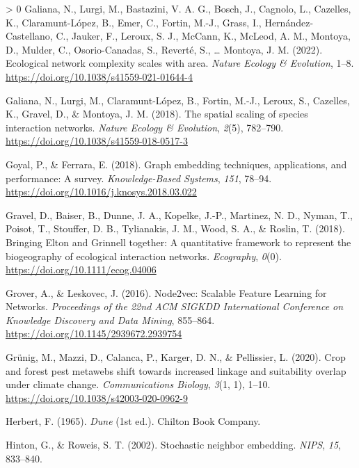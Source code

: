 \documentclass[11pt]{article}
\newlength{\cslhangindent}
\newenvironment{CSLReferences}[3] %
 {%
  \setlength{\parindent}{0pt}
  \ifodd #1 \everypar{\setlength{\hangindent}{\cslhangindent}}\ignorespaces\fi
  \ifnum #2 > 0
  \setlength{\parskip}{#2\baselineskip}
  \fi
 }%
 {}
\begin{document}
\begin{CSLReferences}{1}{0}
\leavevmode\hypertarget{ref-Galiana2022EcoNet}{}%
Galiana, N., Lurgi, M., Bastazini, V. A. G., Bosch, J., Cagnolo, L.,
Cazelles, K., Claramunt-López, B., Emer, C., Fortin, M.-J., Grass, I.,
Hernández-Castellano, C., Jauker, F., Leroux, S. J., McCann, K., McLeod,
A. M., Montoya, D., Mulder, C., Osorio-Canadas, S., Reverté, S.,
\ldots{} Montoya, J. M. (2022). Ecological network complexity scales
with area. \emph{Nature Ecology \& Evolution}, 1--8.
\url{https://doi.org/10.1038/s41559-021-01644-4}

\leavevmode\hypertarget{ref-Galiana2018SpaSca}{}%
Galiana, N., Lurgi, M., Claramunt-López, B., Fortin, M.-J., Leroux, S.,
Cazelles, K., Gravel, D., \& Montoya, J. M. (2018). The spatial scaling
of species interaction networks. \emph{Nature Ecology \& Evolution},
\emph{2}(5), 782--790. \url{https://doi.org/10.1038/s41559-018-0517-3}

\leavevmode\hypertarget{ref-Goyal2018GraEmb}{}%
Goyal, P., \& Ferrara, E. (2018). Graph embedding techniques,
applications, and performance: A survey. \emph{Knowledge-Based Systems},
\emph{151}, 78--94. \url{https://doi.org/10.1016/j.knosys.2018.03.022}

\leavevmode\hypertarget{ref-Gravel2018BriElt}{}%
Gravel, D., Baiser, B., Dunne, J. A., Kopelke, J.-P., Martinez, N. D.,
Nyman, T., Poisot, T., Stouffer, D. B., Tylianakis, J. M., Wood, S. A.,
\& Roslin, T. (2018). Bringing Elton and Grinnell together: A
quantitative framework to represent the biogeography of ecological
interaction networks. \emph{Ecography}, \emph{0}(0).
\url{https://doi.org/10.1111/ecog.04006}

\leavevmode\hypertarget{ref-Grover2016NodSca}{}%
Grover, A., \& Leskovec, J. (2016). Node2vec: Scalable Feature Learning
for Networks. \emph{Proceedings of the 22nd ACM SIGKDD International
Conference on Knowledge Discovery and Data Mining}, 855--864.
\url{https://doi.org/10.1145/2939672.2939754}

\leavevmode\hypertarget{ref-Grunig2020CroFor}{}%
Grünig, M., Mazzi, D., Calanca, P., Karger, D. N., \& Pellissier, L.
(2020). Crop and forest pest metawebs shift towards increased linkage
and suitability overlap under climate change. \emph{Communications
Biology}, \emph{3}(1, 1), 1--10.
\url{https://doi.org/10.1038/s42003-020-0962-9}

\leavevmode\hypertarget{ref-Herbert1965Dun}{}%
Herbert, F. (1965). \emph{Dune} (1st ed.). Chilton Book Company.

\leavevmode\hypertarget{ref-Hinton2002StoNei}{}%
Hinton, G., \& Roweis, S. T. (2002). Stochastic neighbor embedding.
\emph{NIPS}, \emph{15}, 833--840.


\end{CSLReferences}
\end{document}
